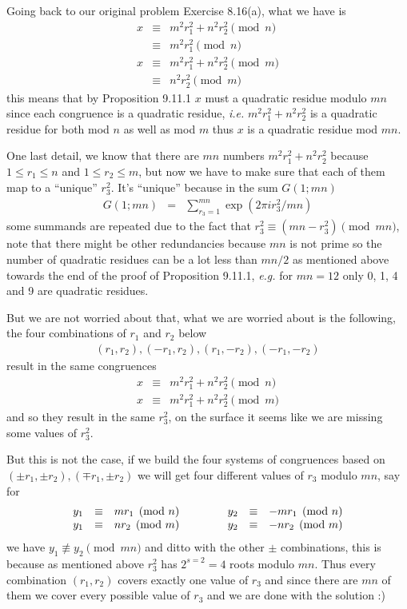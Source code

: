 \documentclass[aps,preprint,preprintnumbers,nofootinbib,showpacs,prd]{revtex4-1}
\newcommand{\ie}{{\it i.e.} }
\newcommand{\eg}{{\it e.g.} }
\newcommand{\nbea}{\begin{eqnarray*}}
\newcommand{\neea}{\end{eqnarray*}}
\begin{document}
Going back to our original problem Exercise 8.16(a), what we have is
%
\nbea
x & \equiv & m^2 r_1^2 + n^2 r_2^2 \pmod{n} \\
& \equiv & m^2 r_1^2 \pmod{n} \\
x & \equiv & m^2 r_1^2 + n^2 r_2^2 \pmod{m} \\
& \equiv &n^2 r_2^2 \pmod{m}
\neea
%
this means that by Proposition 9.11.1 $x$ must a quadratic residue modulo $mn$ since each congruence is a quadratic residue, \ie $m^2 r_1^2 + n^2 r_2^2$ is a quadratic residue for both mod $n$ as well as mod $m$ thus $x$ is a quadratic residue mod $mn$.

One last detail, we know that there are $mn$ numbers $m^2r_1^2 + n^2r_2^2$ because $1\le r_1\le n$ and $1 \le r_2\le m$, but now we have to make sure that each of them map to a ``unique'' $r_3^2$. It's ``unique'' because in the sum $G(1;mn)$
%
\nbea
G(1;mn) & = & \sum_{r_3=1}^{mn} \exp(2\pi i r_3^2/mn)
\neea
%
some summands are repeated due to the fact that $r_3^2 \equiv (mn-r_3^2) \pmod{mn}$, note that there might be other redundancies because $mn$ is not prime so the number of quadratic residues can be a lot less than $mn/2$ as mentioned above towards the end of the proof of Proposition 9.11.1, \eg for $mn=12$ only 0, 1, 4 and 9 are quadratic residues. 

But we are not worried about that, what we are worried about is the following, the four combinations of $r_1$ and $r_2$ below
%
\nbea
(r_1, r_2),(-r_1, r_2),(r_1, -r_2),(-r_1, -r_2)
\neea
%
result in the same congruences 
%
\nbea
x & \equiv & m^2r_1^2 + n^2r_2^2 \pmod{n} \\
x & \equiv & m^2r_1^2 + n^2r_2^2 \pmod{m}
\neea
%
and so they result in the same $r_3^2$, on the surface it seems like we are missing some values of $r_3^2$.

But this is not the case, if we build the four systems of congruences based on $(\pm r_1,\pm r_2), (\mp r_1,\pm r_2)$ we will get four different values of $r_3$ modulo $mn$, say for
%
\nbea
\begin{array}{r c l c r c l}
y_1 & \equiv & mr_1 \pmod{n} & ~~~~~~~ & y_2 & \equiv & -mr_1 \pmod{n} \\
y_1 & \equiv & nr_2 \pmod{m} & ~~~~~~~ & y_2 & \equiv & -nr_2 \pmod{m}
\end{array}
\neea
%
we have $y_1 \not\equiv y_2 \pmod{mn}$ and ditto with the other $\pm$ combinations, this is because as mentioned above $r_3^2$ has $2^{s=2} = 4$ roots modulo $mn$. Thus every combination $(r_1, r_2)$ covers exactly one value of $r_3$ and since there are $mn$ of them we cover every possible value of $r_3$ and we are done with the solution :)
\end{document}
